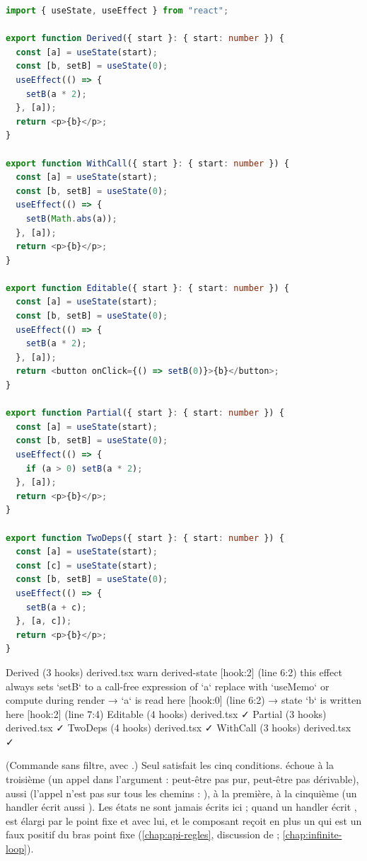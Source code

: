 \begin{lstlisting}[language=TypeScript,caption={Dérivations, vraies et fausses (\file{/tmp/ch18/derived.tsx})},label={lst:regles-etat-derived-ex}]
import { useState, useEffect } from "react";

export function Derived({ start }: { start: number }) {
  const [a] = useState(start);
  const [b, setB] = useState(0);
  useEffect(() => {
    setB(a * 2);
  }, [a]);
  return <p>{b}</p>;
}

export function WithCall({ start }: { start: number }) {
  const [a] = useState(start);
  const [b, setB] = useState(0);
  useEffect(() => {
    setB(Math.abs(a));
  }, [a]);
  return <p>{b}</p>;
}

export function Editable({ start }: { start: number }) {
  const [a] = useState(start);
  const [b, setB] = useState(0);
  useEffect(() => {
    setB(a * 2);
  }, [a]);
  return <button onClick={() => setB(0)}>{b}</button>;
}

export function Partial({ start }: { start: number }) {
  const [a] = useState(start);
  const [b, setB] = useState(0);
  useEffect(() => {
    if (a > 0) setB(a * 2);
  }, [a]);
  return <p>{b}</p>;
}

export function TwoDeps({ start }: { start: number }) {
  const [a] = useState(start);
  const [c] = useState(start);
  const [b, setB] = useState(0);
  useEffect(() => {
    setB(a + c);
  }, [a, c]);
  return <p>{b}</p>;
}
\end{lstlisting}

\begin{sortie}
  Derived  (3 hooks)  derived.tsx
    warn   derived-state  [hook:2]  (line 6:2)  this effect always sets `setB` to a call-free expression of `a` replace with `useMemo` or compute during render
       → `a` is read here [hook:0] (line 6:2)
       → state `b` is written here [hook:2] (line 7:4)
  Editable  (4 hooks)  derived.tsx  ✓
  Partial  (3 hooks)  derived.tsx  ✓
  TwoDeps  (4 hooks)  derived.tsx  ✓
  WithCall  (3 hooks)  derived.tsx  ✓
\end{sortie}

(Commande sans filtre, avec .) Seul  satisfait les cinq conditions.  échoue à la troisième (un appel dans l'argument : peut-être pas pur, peut-être pas dérivable),  aussi (l'appel n'est pas sur tous les chemins : ),  à la première,  à la cinquième (un handler écrit aussi ). Les états  ne sont jamais écrits ici ; quand un handler écrit ,  est élargi par le point fixe et  avec lui, et le composant reçoit en plus un \Warning{}  qui est un faux positif du bras point fixe (\cref{chap:api-regles}, discussion de  ; \cref{chap:infinite-loop}).


